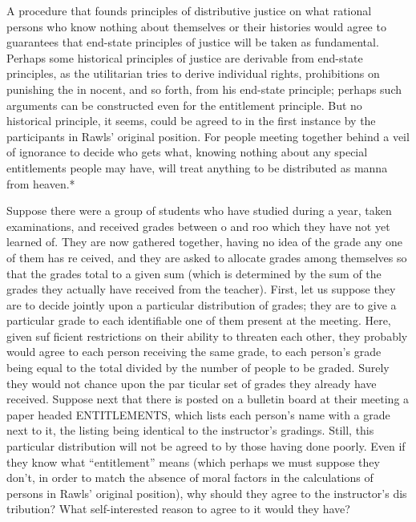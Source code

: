 \documentclass[11pt,openany]{book}
\begin{document}
A procedure that founds principles of distributive justice on what rational persons who know nothing about themselves or their histories would agree to guarantees that end-state principles of justice will be taken as fundamental. Perhaps some historical principles of justice are derivable from end-state principles, as the utilitarian tries to derive individual rights, prohibitions on punishing the in nocent, and so forth, from his end-state principle; perhaps such arguments can be constructed even for the entitlement principle. But no historical principle, it seems, could be agreed to in the first instance by the participants in Rawls' original position. For people meeting together behind a veil of ignorance to decide who gets what, knowing nothing about any special entitlements people may have, will treat anything to be distributed as manna from heaven.* 

Suppose there were a group of students who have studied during a year, taken examinations, and received grades between o and roo which they have not yet learned of. They are now gathered together, having no idea of the grade any one of them has re ceived, and they are asked to allocate grades among themselves so that the grades total to a given sum (which is determined by the sum of the grades they actually have received from the teacher). First, let us suppose they are to decide jointly upon a particular distribution of grades; they are to give a particular grade to each identifiable one of them present at the meeting. Here, given suf ficient restrictions on their ability to threaten each other, they probably would agree to each person receiving the same grade, to each person's grade being equal to the total divided by the number of people to be graded. Surely they would not chance upon the par ticular set of grades they already have received. Suppose next that there is posted on a bulletin board at their meeting a paper headed ENTITLEMENTS, which lists each person's name with a grade next to it, the listing being identical to the instructor's gradings. Still, this particular distribution will not be agreed to by those having done poorly. Even if they know what ``entitlement'' means (which perhaps we must suppose they don't, in order to match the absence of moral factors in the calculations of persons in Rawls' original position), why should they agree to the instructor's dis tribution? What self-interested reason to agree to it would they have? 
\end{document}
